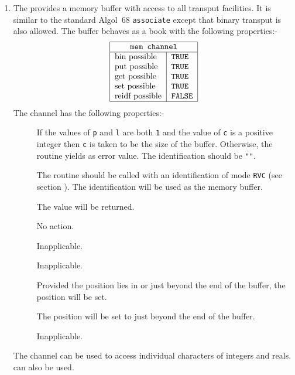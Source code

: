\begin{enumerate}
\item {}\hypertarget{stan-memch}{}\label{stan-memch}{}\newline
The  provides a memory buffer with access to all transput
facilities. It is similar to the standard Algol~68 \verb|associate|
except that binary transput is also allowed. The buffer behaves as a
book with the following properties:-
$$\begin{tabular}{|l|l|}\hline
  \multicolumn{2}{|c|}{\texttt{mem channel}}\\ \hline
  bin possible & \texttt{TRUE} \\
  put possible & \texttt{TRUE} \\
  get possible & \texttt{TRUE} \\
  set possible & \texttt{TRUE} \\
  reidf possible & \texttt{FALSE}\\ \hline
  \end{tabular}
$$
The channel has the following properties:-
\begin{description}
\item[] If the values of \verb|p| and \verb|l| are both
\verb|1| and the value of \verb|c| is a positive integer then \verb|c|
is taken to be the size of the buffer. Otherwise, the routine yields
 as error value. The identification
should be \verb|""|.
\item[] The routine should be called with an identification of mode
\verb|RVC| (see section ). The identification will be
used as the memory buffer.
\item[] The value  will be
returned.
\item[] No action.
\item[] Inapplicable.
\item[] Inapplicable.
\item[] Provided the position lies in or just beyond the end of the
buffer, the position will be set.
\item[] The position will be set to just beyond the end of
the buffer.
\item[] Inapplicable.
\end{description}
The channel can be used to access individual characters of integers and
reals.  can also be used.


\end{enumerate}
